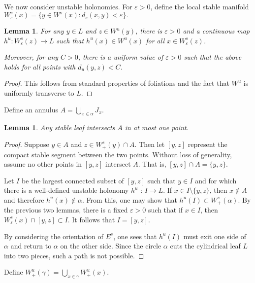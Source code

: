 \documentclass[11pt]{amsart} %
\newcommand{\Es}{E^s}
\newcommand{\Ws}{W^s}
\newcommand{\Wu}{W^u}
\newcommand{\Wup}{W^u_+}
\newcommand{\Wsp}{W^s_+}
\newcommand{\sans}{\setminus}
\newcommand{\subof}{\subset}
\newcommand{\eps}{\varepsilon}
\numberwithin{equation}{section}
\newtheorem{lemma}[equation]{Lemma}
\theoremstyle{remark}
\begin{document}
We now consider unstable holonomies.
For $\eps > 0$, define the local stable manifold
\begin{math}
    \Ws_\eps(x) = \{ y  \in  \Ws(x) : d_s(x,y) < \eps \}.
\end{math}


\begin{lemma} \label{lemma:holonomy}
    For any $y  \in  L$ and $z  \in  \Wu(y)$, there is $\eps > 0$
    and a continuous map $h^u : \Ws_\eps(z) \to L$
    such that $h^u(x)  \in  \Wu(x)$ for all $x  \in  \Ws_\eps(z)$.

    Moreover, for any $C > 0$, there is a uniform value of $\eps > 0$
    such that the above holds for all points with
    $d_u(y,z) < C$.
\end{lemma}
\begin{proof}
    This follows from standard properties of foliations
    and the fact that $\Wu$ is uniformly transverse to $L$.
\end{proof}

Define an annulus $A = \bigcup_{x  \in  \alpha} J_x$.

\begin{lemma} \label{lemma:tail}
    Any stable leaf intersects $A$ in at most one point.
          \end{lemma}
\begin{proof}
    Suppose $y  \in  A$ and $z  \in  \Wsp(y) \cap A$.
    Then let $[y,z]$
    represent the compact stable segment between the two points.
    Without loss of generality,
    assume no other points in $[y,z]$ intersect $A$.
    That is, $[y,z] \cap A = \{y,z\}$.

    Let $I$ be the largest connected subset of $[y,z]$
    such that $y  \in  I$ and for which there is a well-defined
    unstable holonomy $h^u$ : $I  \to  L$.
    If $x  \in  I \sans \{y,z\}$, then $x \notin A$ and therefore $h^u(x) \notin \alpha$.
    From this, one may show that $h^u(I) \subof \Wsp(\alpha)$.
    By the previous two lemmas, there is a fixed $\eps > 0$
    such that if $x  \in  I$, then $\Ws_\eps(x) \cap [y,z] \subof I$.
    It follows that $I = [y,z]$.

    By considering the orientation of $\Es$, one sees that
    $h^u(I)$ must exit one side of $\alpha$ and return to $\alpha$ on the other side.
    Since the circle $\alpha$ cuts the cylindrical leaf $L$ into two pieces,
    such a path is not possible.
\end{proof}

Define $\Wup(\gamma) = \bigcup_{x \in \gamma} \Wup(x)$.
\end{document}
